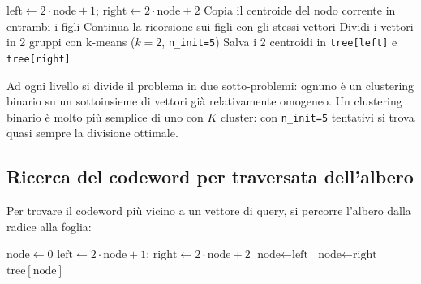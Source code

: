 \documentclass[12pt, a4paper]{article}
\begin{document}
\begin{algorithm}[H]
\caption{Costruzione TSVQ per una regione}
\begin{algorithmic}[1]
     \Return \EndIf
    \State $\text{left} \leftarrow 2 \cdot \text{node} + 1$;\quad
           $\text{right} \leftarrow 2 \cdot \text{node} + 2$
        \State Copia il centroide del nodo corrente in entrambi i figli
        \State Continua la ricorsione sui figli con gli stessi vettori
        \Return
    \EndIf
    \State Dividi i vettori in 2 gruppi con k-means ($k=2$, \texttt{n\_init=5})
    \State Salva i 2 centroidi in \texttt{tree[left]} e \texttt{tree[right]}
    \State {}
    \State {}
\EndProcedure
\end{algorithmic}
\end{algorithm}

Ad ogni livello si divide il problema in due sotto-problemi: ognuno è un clustering binario
su un sottoinsieme di vettori già relativamente omogeneo. Un clustering binario è molto più
semplice di uno con $K$ cluster: con \texttt{n\_init=5} tentativi si trova quasi sempre
la divisione ottimale.

\subsection{Ricerca del codeword per traversata dell'albero}

Per trovare il codeword più vicino a un vettore di query, si percorre l'albero dalla radice
alla foglia:

\begin{algorithm}[H]
\caption{Traversata TSVQ}
\begin{algorithmic}[1]
    \State $\text{node} \leftarrow 0$ 
        \State $\text{left} \leftarrow 2 \cdot \text{node} + 1$;\quad
               $\text{right} \leftarrow 2 \cdot \text{node} + 2$
            \State $\text{node} \leftarrow \text{left}$
        \Else
            \State $\text{node} \leftarrow \text{right}$
        \EndIf
    \EndFor
    \Return $\text{tree}[\text{node}]$ 
\EndProcedure
\end{algorithmic}
\end{algorithm}
\end{document}
